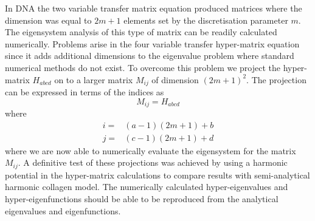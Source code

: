 In DNA the two variable transfer matrix equation produced matrices where the dimension was equal to $2m+1$ elements set by the discretisation parameter $m$. The eigensystem analysis of this type of matrix can be readily calculated numerically. Problems arise in the four variable transfer hyper-matrix equation since it adds additional dimensions to the eigenvalue problem where standard numerical methods do not exist. To overcome this problem we project the hyper-matrix $H_{abcd}$ on to a larger matrix $M_{ij}$ of dimension $(2m+1)^{2}$. The projection can be expressed in terms of the indices as
%
\begin{equation}
M_{ij}=H_{abcd}
\end{equation}
%
where
%
\begin{align}
i=&(a-1)(2m+1)+b\\
j=&(c-1)(2m+1)+d
\end{align}
%
where we are now able to numerically evaluate the eigensystem for the matrix $M_{ij}$. A definitive test of these projections was achieved by using a harmonic potential in the hyper-matrix calculations to compare results with semi-analytical harmonic collagen model. The numerically calculated hyper-eigenvalues and hyper-eigenfunctions should be able to be reproduced from the analytical eigenvalues and eigenfunctions.

